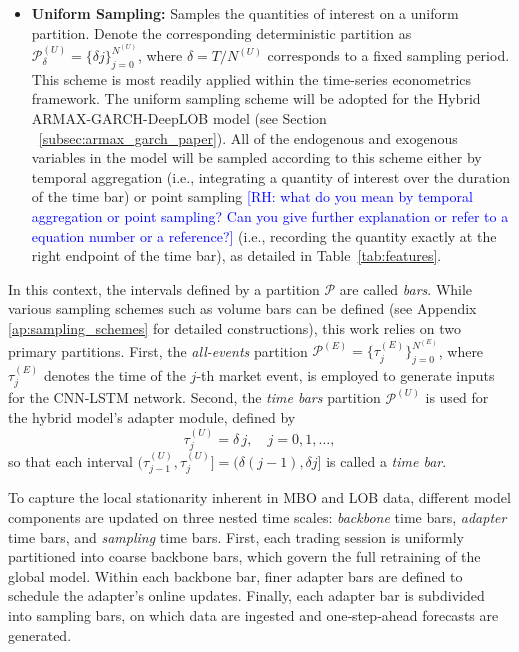 \documentclass[10pt,a4paper,oneside]{article}
\newcommand{\rh}[1]{\textcolor{blue}{\textsf{[RH: #1]}}}
\providecommand{\DIFaddtex}[1]{{\protect\color{blue} \sf #1}} %
\providecommand{\DIFdeltex}[1]{{\protect\color{red} \scriptsize #1}} %
\providecommand{\DIFaddbegin}{} %
\providecommand{\DIFaddend}{} %
\providecommand{\DIFdelbegin}{} %
\providecommand{\DIFdelend}{} %
\providecommand{\DIFadd}[1]{\texorpdfstring{\DIFaddtex{#1}}{#1}} %
\providecommand{\DIFdel}[1]{\texorpdfstring{\DIFdeltex{#1}}{}} %
\newcommand{\DIFscaledelfig}{0.5}
\newlength{\DIFdelgraphicswidth} %
\newlength{\DIFdelgraphicsheight} %
\newcommand{\DIFaddincludegraphics}[2][]{{\color{blue}\fbox{\DIFOincludegraphics[#1]{#2}}}} %
\newcommand{\DIFdelincludegraphics}[2][]{%
\sbox{\DIFdelgraphicsbox}{\DIFOincludegraphics[#1]{#2}}%
\settoboxwidth{\DIFdelgraphicswidth}{\DIFdelgraphicsbox} %
\settoboxtotalheight{\DIFdelgraphicsheight}{\DIFdelgraphicsbox} %
\scalebox{\DIFscaledelfig}{%
\parbox[b]{\DIFdelgraphicswidth}{\usebox{\DIFdelgraphicsbox}\\[-\baselineskip] \rule{\DIFdelgraphicswidth}{0em}}\llap{\resizebox{\DIFdelgraphicswidth}{\DIFdelgraphicsheight}{%
\setlength{\unitlength}{\DIFdelgraphicswidth}%
\begin{picture}(1,1)%
\thicklines\linethickness{2pt} %
{\color[rgb]{1,0,0}\put(0,0){\framebox(1,1){}}}%
{\color[rgb]{1,0,0}\put(0,0){\line( 1,1){1}}}%
{\color[rgb]{1,0,0}\put(0,1){\line(1,-1){1}}}%
\end{picture}%
}\hspace*{3pt}}} %
} %
\DeclareRobustCommand{\DIFaddbegin}{\DIFOaddbegin \let\includegraphics\DIFaddincludegraphics} %
\DeclareRobustCommand{\DIFaddend}{\DIFOaddend \let\includegraphics\DIFOincludegraphics} %
\DeclareRobustCommand{\DIFdelbegin}{\DIFOdelbegin \let\includegraphics\DIFdelincludegraphics} %
\DeclareRobustCommand{\DIFdelend}{\DIFOaddend \let\includegraphics\DIFOincludegraphics} %
\begin{document}
\begin{itemize}
\begin{itemize}
            \item \textbf{Uniform Sampling:} Samples the quantities of interest on a uniform partition. Denote the corresponding deterministic partition as $\mathcal{P}^{(U)}_{\delta} = \{\delta j\}_{j=0}^{N^{(U)}}$, where $\delta = T / N^{(U)}$ corresponds to a fixed sampling period. This scheme is most readily applied within the time-series econometrics framework. The uniform sampling scheme will be adopted for the Hybrid ARMAX-GARCH-DeepLOB model (see Section\DIFaddbegin \DIFadd{~}\DIFaddend \ref{subsec:armax_garch_paper}). All of the endogenous and exogenous variables in the model will be sampled according to this scheme either by temporal aggregation \DIFaddbegin \DIFadd{(i.e., integrating a quantity of interest over the duration of the time bar) }\DIFaddend or point sampling \DIFdelbegin \DIFdel{\rh{what do you mean by temporal aggregation or point sampling? Can you give further explanation or refer to a equation number or a reference?}}\DIFdelend \DIFaddbegin \DIFadd{(i.e., recording the quantity exactly at the right endpoint of the time bar), as detailed in Table~\ref{tab:features}}\DIFaddend .
        \end{itemize}
\end{itemize}

In this context, the intervals defined by a partition \(\mathcal{P}\) are called \emph{bars}. While various sampling schemes such as volume bars can be defined (see Appendix \ref{ap:sampling_schemes} for detailed constructions), this work relies on two primary partitions. First, the \emph{all-events} partition \(\mathcal{P}^{(E)} = \{\tau^{(E)}_j\}_{j=0}^{N^{(E)}}\), where \(\tau^{(E)}_j\) denotes the time of the \(j\)-th market event, is employed to generate inputs for the CNN-LSTM network. Second, the \emph{time bars} partition \(\mathcal{P}^{(U)}\) is used for the hybrid model's adapter module, defined by
\[
    \tau^{(U)}_j=\delta\,j,\quad j=0,1,\dots,
\]
so that each interval \((\tau^{(U)}_{j-1},\tau^{(U)}_j]=(\delta(j-1),\delta j]\) is called a \emph{time bar}.

To capture the local stationarity inherent in MBO and LOB data, different model components are updated on three nested time scales: \emph{backbone} time bars, \emph{adapter} time bars, and \emph{sampling} time bars.  First, each trading session is uniformly partitioned into coarse backbone bars, which govern the full retraining of the global model.  Within each backbone bar, finer adapter bars are defined to schedule the adapter’s online updates. Finally, each adapter bar is subdivided into sampling bars, on which data are ingested and one‐step‐ahead forecasts are generated.
\end{document}
